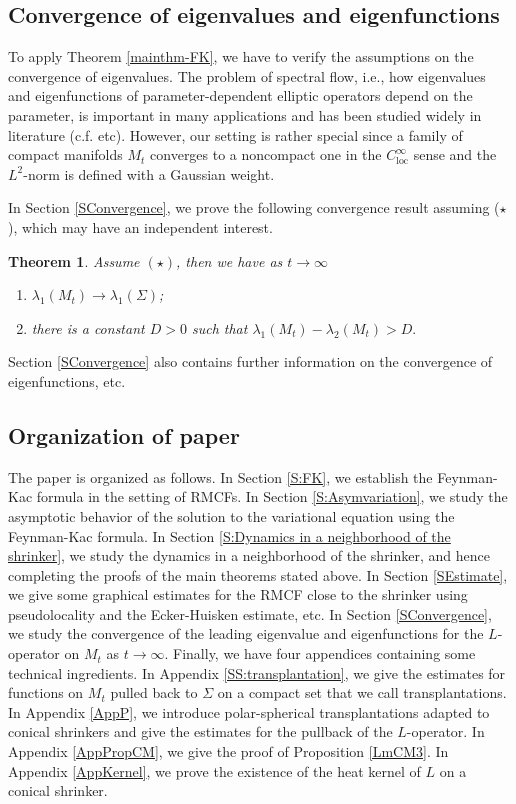\documentclass[12pt]{amsart}
\numberwithin{equation}{section}
\newtheorem{theorem}{Theorem}[section]
\numberwithin{equation}{section}
\DeclareMathOperator{\loc}{loc}
\begin{document}
	\subsection{Convergence of eigenvalues and eigenfunctions}
	
	To apply Theorem \ref{mainthm-FK}, we have to verify the assumptions on the convergence of eigenvalues. The problem of spectral flow, i.e., how eigenvalues and eigenfunctions of parameter-dependent elliptic operators depend on the parameter, is important in many applications and has been studied widely in literature (c.f. \cite{A,HM,U,Z} etc). However, our setting is rather special since a family of compact manifolds $M_t$ converges to a noncompact one in the $C^\infty_{\loc}$ sense and the $L^2$-norm is defined with a Gaussian weight. 
	
	In Section \ref{SConvergence}, we prove the following convergence result assuming ($\star$), which may have an independent interest.  
	\begin{theorem}Assume $(\star)$, then we have as $t\to\infty$ 
		\begin{enumerate}
			\item $\lambda_1(M_t)\to \lambda_1(\Sigma)$;
			\item there is a constant $D>0$ such that $\lambda_1(M_t)-\lambda_2(M_t)>D. $
		\end{enumerate}
	\end{theorem}
	Section \ref{SConvergence} also contains further information on the convergence of eigenfunctions, etc. 
	
	\subsection{Organization of paper}
	The paper is organized as follows. In Section \ref{S:FK}, we establish the Feynman-Kac formula in the setting of RMCFs. In Section \ref{S:Asymvariation}, we study the asymptotic behavior of the solution to the variational equation using the Feynman-Kac formula. In Section \ref{S:Dynamics in a neighborhood of the shrinker}, we study the dynamics in a neighborhood of the shrinker, and hence completing the proofs of the main theorems stated above. In Section \ref{SEstimate}, we give some graphical estimates for the RMCF close to the shrinker using pseudolocality and the Ecker-Huisken estimate, etc. In Section \ref{SConvergence}, we study the convergence of the leading eigenvalue and eigenfunctions for the $L$-operator on $M_t$ as $t\to\infty$. Finally, we have four appendices containing some technical ingredients. In Appendix \ref{SS:transplantation}, we give the estimates for functions on $M_t$ pulled back to $\Sigma$ on a compact set that we call transplantations. In Appendix \ref{AppP}, we introduce polar-spherical transplantations adapted to conical shrinkers and give the estimates for the pullback of the $L$-operator. In Appendix \ref{AppPropCM}, we give the proof of Proposition \ref{LmCM3}. In Appendix \ref{AppKernel}, we prove the existence of the heat kernel of $L$ on a conical shrinker. 
	
\end{document}
